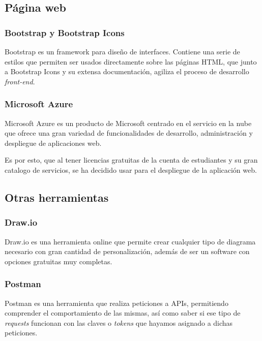 \subsection{Página web}

\subsubsection{Bootstrap y Bootstrap Icons}
Bootstrap \cite{Getstart3:online} es un framework para diseño de interfaces. Contiene una serie de estilos que permiten ser usados directamente sobre las páginas HTML, que junto  a Bootstrap Icons y su extensa documentación, agiliza el proceso de desarrollo \textit{front-end}.


\subsubsection{Microsoft Azure}
Microsoft Azure \cite{Document56:online} es un producto de Microsoft centrado en el servicio en la nube que ofrece una gran variedad de funcionalidades de desarrollo, administración y despliegue de aplicaciones web.

Es por esto, que al tener licencias gratuitas de la cuenta de estudiantes y su gran catalogo de servicios, se ha decidido usar para el despliegue de la aplicación web.

\subsection{Otras herramientas}
\subsubsection{Draw.io}
Draw.io \cite{drawio54:online} es una herramienta online que permite crear cualquier tipo de diagrama necesario con gran cantidad de personalización, además de ser un software con opciones gratuitas muy completas.

\subsubsection{Postman}
Postman \cite{PostmanA62:online} es una herramienta que realiza peticiones a APIs, permitiendo comprender el comportamiento de las mismas, así como saber si ese tipo de \textit{requests} funcionan con las claves o \textit{tokens} que hayamos asignado a dichas peticiones.